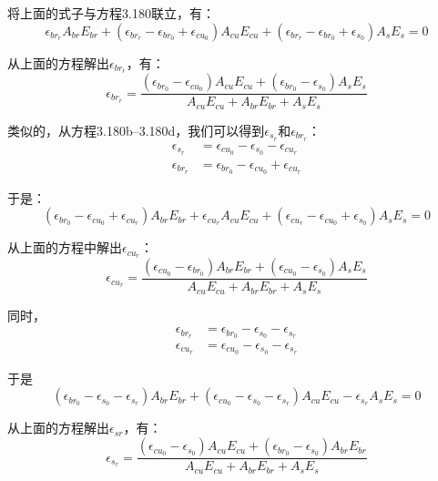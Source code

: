 将上面的式子与方程3.180联立，有：
\begin{equation*}
\epsilon_{br_r}A_{br}E_{br}+(\epsilon_{br_r}-\epsilon_{br_0}+\epsilon_{cu_0})A_{cu}E_{cu}+(\epsilon_{br_r}-\epsilon_{br_0}+\epsilon_{s_0})A_sE_s=0
\end{equation*}

从上面的方程解出$\epsilon_{br_r}$，有：
 \begin{equation}%
\epsilon_{br_r}=\frac{(\epsilon_{br_0}-\epsilon_{cu_0})A_{cu}E_{cu}+(\epsilon_{br_0}-\epsilon_{s_0})A_sE_s}{A_{cu}E_{cu}+A_{br}E_{br}+A_{s}E_{s}}
\end{equation}

类似的，从方程3.180b–3.180d，我们可以得到$\epsilon_{s_r}$和$\epsilon_{br_r}$：
\begin{eqnarray*}
\epsilon_{s_r}&=\epsilon_{cu_0}-\epsilon_{s_0}-\epsilon_{cu_r}\\
\epsilon_{br_r}&=\epsilon_{br_0}-\epsilon_{cu_0}+\epsilon_{cu_r}
\end{eqnarray*}

于是：
\begin{equation*}
(\epsilon_{br_0}-\epsilon_{cu_0}+\epsilon_{cu_r})A_{br}E_{br}+\epsilon_{cu_r}A_{cu}E_{cu}+(\epsilon_{cu_r}-\epsilon_{cu_0}+\epsilon_{s_0})A_sE_s=0
\end{equation*}

从上面的方程中解出$\epsilon_{cu_r}$：
\begin{equation}%
\epsilon_{cu_r}=\frac{(\epsilon_{cu_0}-\epsilon_{br_0})A_{br}E_{br}+(\epsilon_{cu_0}-\epsilon_{s_0})A_sE_s}{A_{cu}E_{cu}+A_{br}E_{br}+A_{s}E_{s}}
\end{equation}

同时，
\begin{eqnarray*}
\epsilon_{br_r}&=\epsilon_{br_0}-\epsilon_{s_0}-\epsilon_{s_r}\\
\epsilon_{cu_r}&=\epsilon_{cu_0}-\epsilon_{s_0}-\epsilon_{s_r}
\end{eqnarray*}

于是
\begin{equation*}
(\epsilon_{br_0}-\epsilon_{s_0}-\epsilon_{s_r})A_{br}E_{br}+(\epsilon_{cu_0}-\epsilon_{s_0}-\epsilon_{s_r})A_{cu}E_{cu}-\epsilon_{s_r}A_sE_s=0
\end{equation*}

从上面的方程解出$\epsilon_{sr}$，有：
\begin{equation}%
\epsilon_{s_r}=\frac{(\epsilon_{cu_0}-\epsilon_{s_0})A_{cu}E_{cu}+(\epsilon_{br_0}-\epsilon_{s_0})A_{br}E_{br}}{A_{cu}E_{cu}+A_{br}E_{br}+A_{s}E_{s}}
\end{equation}

